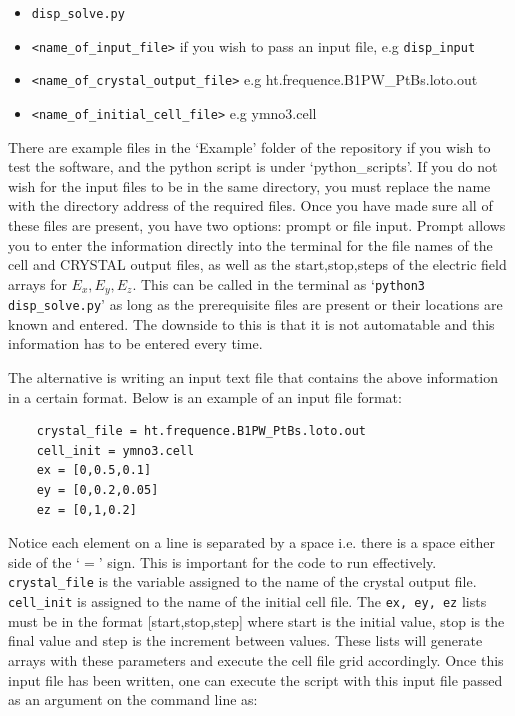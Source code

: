 \documentclass[10pt]{article}
\begin{document}
\begin{itemize}
	\item \texttt{disp\_solve.py}
	\item \texttt{<name\_of\_input\_file>} if you wish to pass an input file, e.g \texttt{disp\_input}
	\item \texttt{<name\_of\_crystal\_output\_file>} e.g ht.frequence.B1PW\_PtBs.loto.out
	\item \texttt{<name\_of\_initial\_cell\_file>} e.g ymno3.cell
\end{itemize}

There are example files in the `Example' folder of the repository if you wish to test the software, and the python script is under `python\_scripts'. If you do not wish for the input files to be in the same directory, you must replace the name with the directory address of the required files. Once you have made sure all of these files are present, you have two options: prompt or file input. Prompt allows you to enter the information directly into the terminal for the file names of the cell and CRYSTAL output files, as well as the start,stop,steps of the electric field arrays for $E_x,E_y,E_z$. This can be called in the terminal as `\texttt{python3 disp\_solve.py}' as long as the prerequisite files are present or their locations are known and entered. The downside to this is that it is not automatable and this information has to be entered every time.

The alternative is writing an input text file that contains the above information in a certain format. Below is an example of an input file format:

\begin{lstlisting}
	crystal_file = ht.frequence.B1PW_PtBs.loto.out
	cell_init = ymno3.cell
	ex = [0,0.5,0.1]
	ey = [0,0.2,0.05]
	ez = [0,1,0.2]
\end{lstlisting}
Notice each element on a line is separated by a space i.e. there is a space either side of the `$=$' sign. This is important for the code to run effectively. \texttt{crystal\_file} is the variable assigned to the name of the crystal output file. \texttt{cell\_init} is assigned to the name of the initial cell file. The \texttt{ex, ey, ez} lists must be in the format [start,stop,step] where start is the initial value, stop is the final value and step is the increment between values. These lists will generate arrays with these parameters and execute the cell file grid accordingly. Once this input file has been written, one can execute the script with this input file passed as an argument on the command line as:
\end{document}

